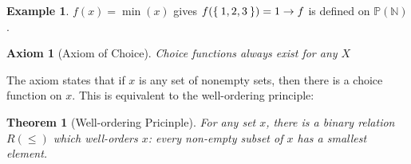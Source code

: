 \documentclass[12pt]{amsart}
\newcommand{\bbN}{\mathbb{N}}
\newcommand{\bbP}{\mathbb{P}}
\theoremstyle{plain}
\newtheorem*{thm}{Theorem}
\newtheorem {AXM}{Axiom}
\theoremstyle{remark}
\theoremstyle{definition}
\newtheorem*{eg}{Example}
\begin{document}
\begin{eg}
	$f(x) = \min(x)$ gives $f(\Set{1,2,3}) = 1 \rightarrow f$ is defined on $\bbP(\bbN)$.
\end{eg}

\begin{AXM}[Axiom of Choice]
	Choice functions always exist for any $X$
\end{AXM}

The axiom states that if $x$ is any set of nonempty sets, then there is a choice function on $x$. This is equivalent to the well-ordering principle: 
\begin{thm}[Well-ordering Pricinple]
	For any set $x$, there is a binary relation $R(\leqslant)$ which well-orders $x$: every non-empty subset of $x$ has a smallest element.
\end{thm}
\end{document}
